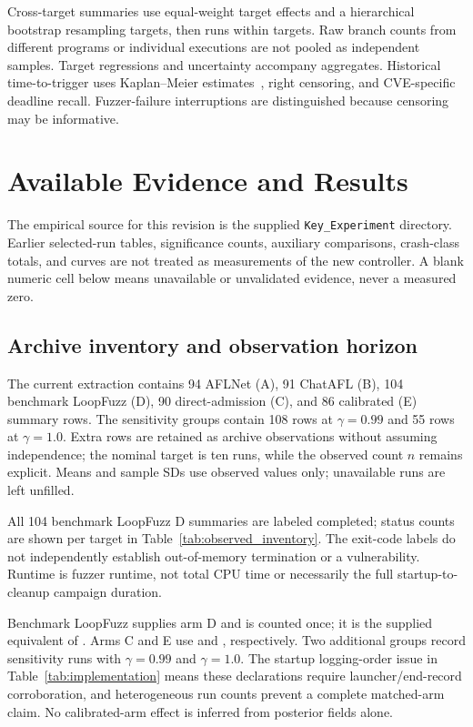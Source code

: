 \documentclass[final,5p,times,number]{elsarticle}
\begin{document}
Cross-target summaries use equal-weight target effects and a hierarchical bootstrap resampling targets, then runs within targets. Raw branch counts from different programs or individual executions are not pooled as independent samples. Target regressions and uncertainty accompany aggregates. Historical time-to-trigger uses Kaplan--Meier estimates~\cite{kaplan1958}, right censoring, and CVE-specific deadline recall. Fuzzer-failure interruptions are distinguished because censoring may be informative.


\section{Available Evidence and Results}
\label{sec:results}
The empirical source for this revision is the supplied \texttt{Key\_Experiment} directory. Earlier selected-run tables, significance counts, auxiliary comparisons, crash-class totals, and curves are not treated as measurements of the new controller. A blank numeric cell below means unavailable or unvalidated evidence, never a measured zero.

\subsection{Archive inventory and observation horizon}
The current extraction contains 94 AFLNet (A), 91 ChatAFL (B), 104 benchmark LoopFuzz (D), 90 direct-admission (C), and 86 calibrated (E) summary rows. The sensitivity groups contain 108 rows at $\gamma=0.99$ and 55 rows at $\gamma=1.0$. Extra rows are retained as archive observations without assuming independence; the nominal target is ten runs, while the observed count $n$ remains explicit. Means and sample SDs use observed values only; unavailable runs are left unfilled.

All 104 benchmark LoopFuzz D summaries are labeled completed; status counts are shown per target in Table~\ref{tab:observed_inventory}. The exit-code labels do not independently establish out-of-memory termination or a vulnerability. Runtime is fuzzer runtime, not total CPU time or necessarily the full startup-to-cleanup campaign duration.

Benchmark LoopFuzz supplies arm D and is counted once; it is the supplied equivalent of . Arms C and E use  and , respectively. Two additional groups record sensitivity runs with $\gamma=0.99$ and $\gamma=1.0$. The startup logging-order issue in Table~\ref{tab:implementation} means these declarations require launcher/end-record corroboration, and heterogeneous run counts prevent a complete matched-arm claim. No calibrated-arm effect is inferred from posterior fields alone.
\end{document}
